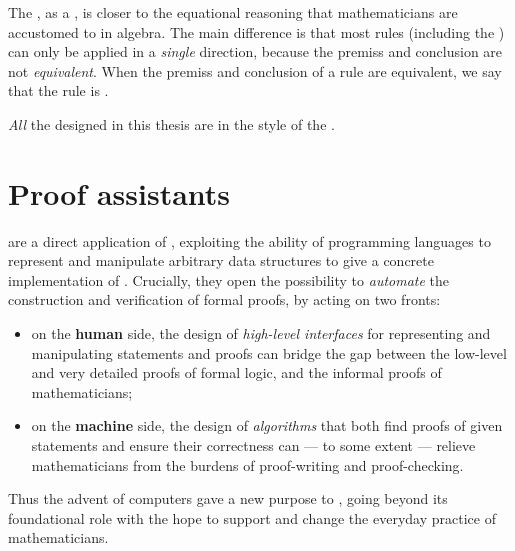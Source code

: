 The , as a , is closer to the
equational reasoning that mathematicians are accustomed to in algebra. The main
difference is that most rules (including the  ) can only
be applied in a \emph{single} direction, because the premiss and conclusion are
not \emph{equivalent}. When
the premiss and conclusion of a rule are equivalent, we say that the rule is
.

\begin{emphpar}
\emph{All} the  designed in this thesis are 
 in the style of the .
\end{emphpar}

\section{Proof assistants}

 are a direct application of , exploiting the
ability of programming languages to represent and manipulate arbitrary data
structures to give a concrete implementation of . Crucially,
they open the possibility to \emph{automate} the construction and verification
of formal proofs, by acting on two fronts:
\begin{itemize}
  \item on the \textbf{human} side, the design of \emph{high-level interfaces}
  for representing and manipulating statements and proofs can bridge the gap
  between the low-level and very detailed proofs of formal logic, and the
  informal proofs of mathematicians;
  \item on the \textbf{machine} side, the design of \emph{algorithms} that both
  find proofs of given statements and ensure their correctness can --- to some
  extent --- relieve mathematicians from the
  burdens of proof-writing and proof-checking.
\end{itemize}
Thus the advent of computers gave a new purpose to , going beyond
its foundational role with the hope to support and change the everyday practice
of mathematicians.

